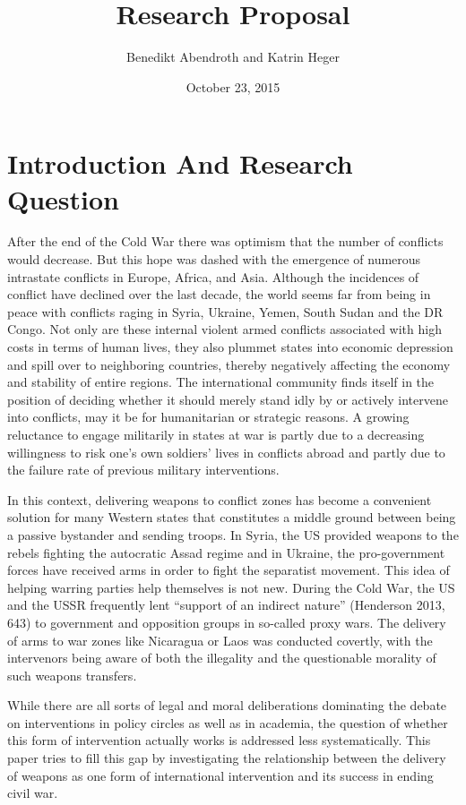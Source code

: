 \documentclass[]{article}
\title{Research Proposal}
\author{Benedikt Abendroth and Katrin Heger}
\date{October 23, 2015}
\begin{document}
\maketitle


\section{Introduction And Research
Question}\label{introduction-and-research-question}

After the end of the Cold War there was optimism that the number of
conflicts would decrease. But this hope was dashed with the emergence of
numerous intrastate conflicts in Europe, Africa, and Asia. Although the
incidences of conflict have declined over the last decade, the world
seems far from being in peace with conflicts raging in Syria, Ukraine,
Yemen, South Sudan and the DR Congo. Not only are these internal violent
armed conflicts associated with high costs in terms of human lives, they
also plummet states into economic depression and spill over to
neighboring countries, thereby negatively affecting the economy and
stability of entire regions. The international community finds itself in
the position of deciding whether it should merely stand idly by or
actively intervene into conflicts, may it be for humanitarian or
strategic reasons. A growing reluctance to engage militarily in states
at war is partly due to a decreasing willingness to risk one's own
soldiers' lives in conflicts abroad and partly due to the failure rate
of previous military interventions.

In this context, delivering weapons to conflict zones has become a
convenient solution for many Western states that constitutes a middle
ground between being a passive bystander and sending troops. In Syria,
the US provided weapons to the rebels fighting the autocratic Assad
regime and in Ukraine, the pro-government forces have received arms in
order to fight the separatist movement. This idea of helping warring
parties help themselves is not new. During the Cold War, the US and the
USSR frequently lent ``support of an indirect nature'' (Henderson 2013,
643) to government and opposition groups in so-called proxy wars. The
delivery of arms to war zones like Nicaragua or Laos was conducted
covertly, with the intervenors being aware of both the illegality and
the questionable morality of such weapons transfers.

While there are all sorts of legal and moral deliberations dominating
the debate on interventions in policy circles as well as in academia,
the question of whether this form of intervention actually works is
addressed less systematically. This paper tries to fill this gap by
investigating the relationship between the delivery of weapons as one
form of international intervention and its success in ending civil war.
\end{document}
